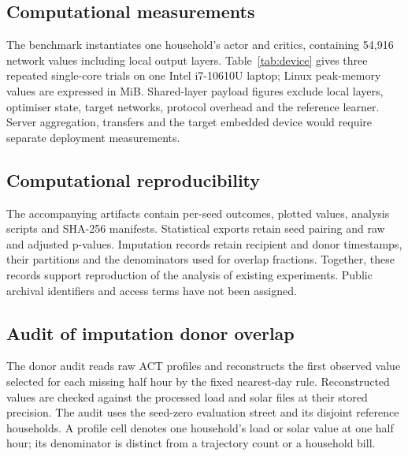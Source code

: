 \documentclass[preprint,12pt,a4paper]{elsarticle}
\begin{document}
\subsection{Computational measurements}
The benchmark instantiates one household's actor and critics, containing 54,916 network values including local output layers. Table~\ref{tab:device} gives three repeated single-core trials on one Intel i7-10610U laptop; Linux peak-memory values are expressed in MiB. Shared-layer payload figures exclude local layers, optimiser state, target networks, protocol overhead and the reference learner. Server aggregation, transfers and the target embedded device would require separate deployment measurements.

\begin{table}[htbp]
\centering\small
\caption{Archived single-core laptop measurements (Intel i7-10610U). Three repeated timing trials on one device; these are not three independent hardware platforms.}
\label{tab:device}
\end{table}



\subsection{Computational reproducibility}
The accompanying artifacts contain per-seed outcomes, plotted values, analysis scripts and SHA-256 manifests. Statistical exports retain seed pairing and raw and adjusted p-values. Imputation records retain recipient and donor timestamps, their partitions and the denominators used for overlap fractions. Together, these records support reproduction of the analysis of existing experiments. Public archival identifiers and access terms have not been assigned.

\subsection{Audit of imputation donor overlap}
The donor audit reads raw ACT profiles and reconstructs the first observed value selected for each missing half hour by the fixed nearest-day rule. Reconstructed values are checked against the processed load and solar files at their stored precision. The audit uses the seed-zero evaluation street and its disjoint reference households. A profile cell denotes one household's load or solar value at one half hour; its denominator is distinct from a trajectory count or a household bill.
\end{document}
